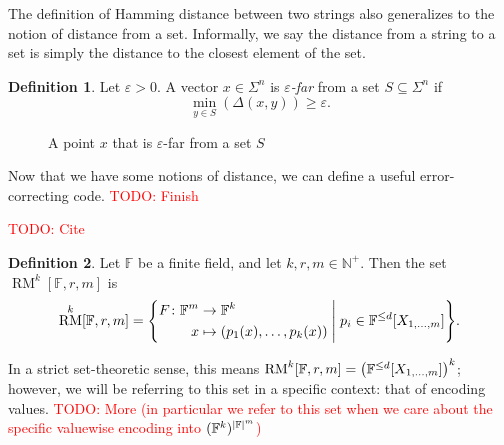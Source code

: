 \documentclass[english,12pt]{reedthesis}
\theoremstyle{plain}
\theoremstyle{definition}
\newtheorem{defn}[defn]{Definition}
\theoremstyle{remark}
\DeclareMathOperator{\RM}{RM}
\DeclarePairedDelimiter{\abs}{\lvert}{\rvert}
\newcommand{\middlemid}{%
  \ensuremath{\;\middle\vert\;}
}
\newcommand{\TODO}[1]{\textcolor{red}{TODO: #1}}
\begin{document}
The definition of Hamming distance between two strings also generalizes to the
notion of distance from a set. Informally, we say the distance from a string to
a set is simply the distance to the closest element of the set.

\begin{defn}\label{def:far}
  Let $\varepsilon > 0$. A vector $x \in \Sigma^{n}$ is \emph{$\varepsilon$-far} from a set $S \subseteq \Sigma^{n}$ if
  \[
    \min_{y \in S}(\Delta(x, y)) \ge \varepsilon.
  \]
\end{defn}

\begin{figure}[htbp]
  \centering
  \caption{A point $x$ that is $\varepsilon$-far from a set $S$}\label{fig:epsilon-far}
\end{figure}

Now that we have some notions of distance, we can define a useful
error-correcting code. \TODO{Finish}

\TODO{Cite}

\begin{defn}\label{def:rm-set}\index{RM@$\RM$}
  Let $\mathbb{F}$ be a finite field, and let $k, r, m \in \mathbb{N}^{+}$. Then the set
  $\RM^{k}[\mathbb{F}, r, m]$ is
  \begin{equation}
    \RM^{k}[\mathbb{F}, r, m] = \mleft\{
      \begin{aligned}
        F\colon \mathbb{F}^{m} &\rightarrow \mathbb{F}^{k} \\
        x &\mapsto (p_{1}(x), \ldots, p_{k}(x))
      \end{aligned}
      \middlemid
      p_{i} \in \mathbb{F}^{\le d}[X_{1, \ldots, m}]
    \mright\}.
  \end{equation}
\end{defn}

In a strict set-theoretic sense, this means
$\RM^{k}[\mathbb{F}, r, m] = \mleft(\mathbb{F}^{\le d}[X_{1, \ldots, m}]\mright)^{k}$;
however, we will be referring to this set in a specific context: that of
encoding values. \TODO{More (in particular we refer to this set when
  we care about the specific valuewise encoding into
  $(\mathbb{F}^{k})^{\abs{\mathbb{F}}^{m}}$)}
\end{document}
